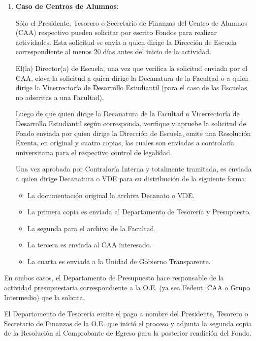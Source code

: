 \begin{enumerate}[label=\textbf{\Alph*.}]
    \item \textbf{Caso de Centros de Alumnos:}

    Sólo el Presidente, Tesorero o Secretario de Finanzas del Centro de Alumnos (CAA) respectivo pueden solicitar por escrito Fondos para realizar actividades. Esta solicitud se envía a quien dirige la Dirección de Escuela correspondiente al menos 20 días antes del inicio de la actividad. 

    El(la) Director(a) de Escuela, una vez que verifica la solicitud enviada por el CAA, eleva la solicitud a quien dirige la Decanatura de la Facultad o a quien dirige la Vicerrectoría de Desarrollo Estudiantil (para el caso de las Escuelas no adscritas a una Facultad).

    Luego de que quien dirige la Decanatura de la Facultad o Vicerrectoría de Desarrollo Estudiantil según corresponda, verifique y apruebe la solicitud de Fondo enviada por quien dirige la Dirección de Escuela, emite una Resolución Exenta, en original y cuatro copias, las cuales son enviadas a controlaría universitaria para el respectivo control de legalidad.

    Una vez aprobada por Contraloría Interna y totalmente tramitada, es enviada a quien dirige Decanatura o VDE para su distribución de la siguiente forma: 
    \begin{itemize}
        \item La documentación original la archiva Decanato o VDE.
        \item La primera copia es enviada al Departamento de Tesorería y Presupuesto.
        \item La segunda para el archivo de la Facultad.
        \item La tercera es enviada al CAA interesado.
        \item La cuarta es enviada a la Unidad de Gobierno Transparente.
    \end{itemize}

\end{enumerate}

En ambos casos, el Departamento de Presupuesto hace responsable de la actividad presupuestaria correspondiente a la O.E. (ya sea Fedeut, CAA o Grupo Intermedio) que la solicita.

El Departamento de Tesorería emite el pago a nombre del Presidente, Tesorero o Secretario de Finanzas de la O.E. que inició el proceso y adjunta la segunda copia de la Resolución al Comprobante de Egreso para la posterior rendición del Fondo.

